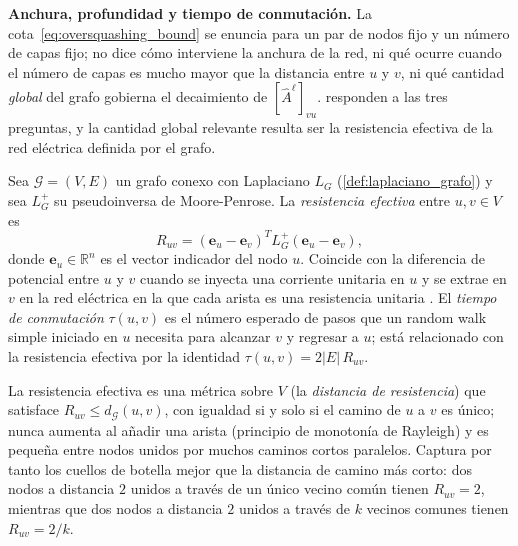 \textbf{Anchura, profundidad y tiempo de conmutación.} La cota~\eqref{eq:oversquashing_bound} se enuncia para un par de nodos fijo y un número de capas fijo; no dice cómo interviene la anchura de la red, ni qué ocurre cuando el número de capas es mucho mayor que la distancia entre $u$ y $v$, ni qué cantidad \textit{global} del grafo gobierna el decaimiento de $[\hat{A}^\ell]_{vu}$. \citet{digiovanni2023oversquashing} responden a las tres preguntas, y la cantidad global relevante resulta ser la resistencia efectiva de la red eléctrica definida por el grafo.

\begin{definition}\label{def:resistencia_efectiva}
	Sea $\mathcal{G} = (V, E)$ un grafo conexo con Laplaciano $L_G$ (\autoref{def:laplaciano_grafo}) y sea $L_G^{+}$ su pseudoinversa de Moore-Penrose. La \textit{resistencia efectiva} entre $u, v \in V$ es
	\[
		R_{uv} = (\mathbf{e}_u - \mathbf{e}_v)^T L_G^{+} (\mathbf{e}_u - \mathbf{e}_v),
	\]
	donde $\mathbf{e}_u \in \mathbb{R}^{n}$ es el vector indicador del nodo $u$. Coincide con la diferencia de potencial entre $u$ y $v$ cuando se inyecta una corriente unitaria en $u$ y se extrae en $v$ en la red eléctrica en la que cada arista es una resistencia unitaria \citep{doyle1984random}. El \textit{tiempo de conmutación} $\tau(u,v)$ es el número esperado de pasos que un random walk simple iniciado en $u$ necesita para alcanzar $v$ y regresar a $u$; está relacionado con la resistencia efectiva por la identidad $\tau(u,v) = 2|E|\, R_{uv}$.
\end{definition}

La resistencia efectiva es una métrica sobre $V$ (la \textit{distancia de resistencia}) que satisface $R_{uv} \leq d_{\mathcal{G}}(u,v)$, con igualdad si y solo si el camino de $u$ a $v$ es único; nunca aumenta al añadir una arista (principio de monotonía de Rayleigh) y es pequeña entre nodos unidos por muchos caminos cortos paralelos. Captura por tanto los cuellos de botella mejor que la distancia de camino más corto: dos nodos a distancia $2$ unidos a través de un único vecino común tienen $R_{uv} = 2$, mientras que dos nodos a distancia $2$ unidos a través de $k$ vecinos comunes tienen $R_{uv} = 2/k$.

